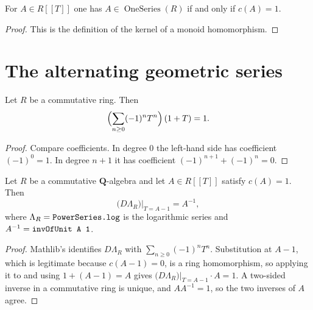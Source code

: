 \begin{lemma}
  \label{lemma:weil-mem-one-submonoid}
  \leanok

  For $A\in R[[T]]$ one has $A\in\operatorname{OneSeries}(R)$ if and only if
  $c(A)=1$.
\end{lemma}

\begin{proof}
  \leanok
  This is the definition of the kernel of a monoid homomorphism.
\end{proof}

\section{The alternating geometric series}
\label{sec:weil-geometric}

\begin{lemma}[Inverse of $1+T$]
  \label{lemma:weil-mk-neg-one-pow-mul-one-add-X}
  \leanok

  Let $R$ be a commutative ring.  Then
  \[
    \Bigl(\sum_{n\ge0}(-1)^nT^n\Bigr)\,(1+T)=1 .
  \]
\end{lemma}

\begin{proof}
  \leanok
  Compare coefficients.  In degree $0$ the left-hand side has coefficient
  $(-1)^0=1$.  In degree $n+1$ it has coefficient
  $(-1)^{n+1}+(-1)^n=0$.
\end{proof}

\begin{lemma}
  \label{lemma:weil-subst-derivative-log}
  \leanok

  Let $R$ be a commutative $\mathbf Q$-algebra and let $A\in R[[T]]$ satisfy
  $c(A)=1$.  Then
  \[
    \bigl(D\Lambda_R\bigr)\big|_{T=A-1}=A^{-1},
  \]
  where $\Lambda_R=\texttt{\detokenize{PowerSeries.log}}$ is the logarithmic
  series and $A^{-1}=\texttt{\detokenize{invOfUnit A 1}}$.
\end{lemma}

\begin{proof}
  \leanok
  Mathlib's \texttt{} identifies
  $D\Lambda_R$ with $\sum_{n\ge0}(-1)^nT^n$.  Substitution at $A-1$, which is
  legitimate because $c(A-1)=0$, is a ring homomorphism, so applying it to
   and using
  $1+(A-1)=A$ gives $\bigl(D\Lambda_R\bigr)\big|_{T=A-1}\cdot A=1$.  A
  two-sided inverse in a commutative ring is unique, and $AA^{-1}=1$, so the
  two inverses of $A$ agree.
\end{proof}

